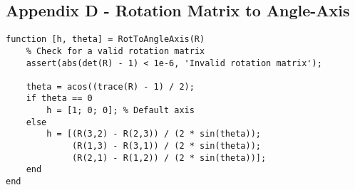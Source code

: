 \subsection{Appendix D - Rotation Matrix to Angle-Axis}
\begin{verbatim}
function [h, theta] = RotToAngleAxis(R)
    % Check for a valid rotation matrix
    assert(abs(det(R) - 1) < 1e-6, 'Invalid rotation matrix');
    
    theta = acos((trace(R) - 1) / 2);
    if theta == 0
        h = [1; 0; 0]; % Default axis
    else
        h = [(R(3,2) - R(2,3)) / (2 * sin(theta));
             (R(1,3) - R(3,1)) / (2 * sin(theta));
             (R(2,1) - R(1,2)) / (2 * sin(theta))];
    end
end
\end{verbatim}
